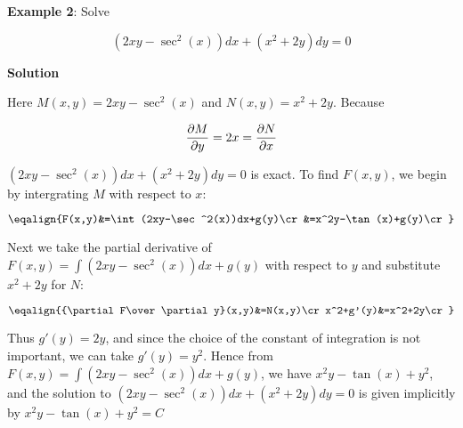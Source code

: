 \nopagenumbers
{\bf Example 2}:  Solve

$$(2xy-\sec^2(x))dx+(x^2+2y)dy=0$$

\vskip 10pt
{\bf Solution}

\vskip 6pt
Here $M(x,y)=2xy-\sec^2(x)$ and $N(x,y)=x^2+2y$. Because

$${\partial M\over\partial y}=2x={\partial N\over\partial x}$$

$(2xy-\sec^2(x))dx+(x^2+2y)dy=0$ is exact. To find $F(x,y)$, we begin by intergrating $M$ with respect to $x$:

$$\eqalign{F(x,y)&=\int(2xy-\sec^2(x))dx+g(y)\cr
	&=x^2y-\tan(x)+g(y)\cr}$$

Next we take the partial derivative of $F(x,y)=\int(2xy-\sec^2(x))dx+g(y)$ with respect to $y$ and substitute $x^2+2y$ for $N$:

$$\eqalign{{\partial F\over\partial y}(x,y)&=N(x,y)\cr
	x^2+g'(y)&=x^2+2y\cr}$$

Thus $g'(y)=2y$, and since the choice of the constant of integration is not important, we can take $g'(y)=y^2$. Hence from $F(x,y)=\int(2xy-\sec^2(x))dx+g(y)$, we have $x^2y-\tan(x)+y^2$, and the solution to $(2xy-\sec^2(x))dx+(x^2+2y)dy=0$  is given implicitly by $x^2y-\tan(x)+y^2=C$

\vfill\eject
\bye
